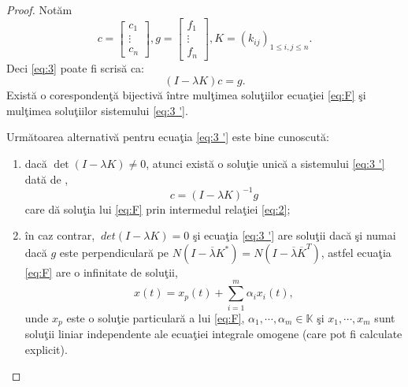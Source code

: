 \documentclass[a4paper,12pt,oneside]{report}
\begin{document}
\begin{proof}
Not\u{a}m
\begin{displaymath}
  c = \begin{bmatrix}
  c_{1}\\
  \vdots \\
  c_{n}
  \end{bmatrix},
  g = \begin{bmatrix}
  f_{1}\\
  \vdots \\
  f_{n}
  \end{bmatrix},
  K = \left ( k_{ij} \right )_{1\leq i,j\leq n}.
\end{displaymath}
Deci \ref{eq:3} poate fi scris\u{a} ca:
\begin{displaymath}
  \left ( I - \lambda K \right )c = g. \label{eq:3 '} \tag{3 '}
\end{displaymath}
Exist\u{a} o coresponden\c{t}\u{a} bijectiv\u{a} \^{i}ntre mul\c{t}imea solu\c{t}iilor ecua\c{t}iei \ref{eq:F} \c{s}i mul\c{t}imea solu\c{t}iilor sistemului \ref{eq:3 '}.

\noindent Urm\u{a}toarea alternativ\u{a} pentru ecua\c{t}ia \ref{eq:3 '} este bine cunoscut\u{a}:
\begin{enumerate}
    \item  dac\u{a} \(\det \left ( I - \lambda K  \right ) \neq 0\), atunci exist\u{a} o solu\c{t}ie unic\u{a} a sistemului \ref{eq:3 '} dat\u{a} de ,
\begin{displaymath}
  c = \left ( I - \lambda K \right )^{-1}g
\end{displaymath}
care d\u{a} solu\c{t}ia lui \ref{eq:F} prin intermedul rela\c{t}iei \ref{eq:2};
\item  \^{i}n caz contrar, \(\ det \left ( I - \lambda K  \right ) = 0\) \c{s}i ecua\c{t}ia \ref{eq:3 '} are solu\c{t}ii dac\u{a} \c{s}i numai dac\u{a} \(g\) este perpendicular\u{a} pe \(N\left ( I - \overline{\lambda} K^{\ast } \right ) = N\left ( I - \overline{\lambda} \overline{K}^{T} \right )\), astfel ecua\c{t}ia \ref{eq:F} are o infinitate de solu\c{t}ii,
\begin{displaymath}
  x \left ( t \right ) = x_{p}\left ( t \right ) + \sum_{i = 1}^{m}\alpha _{i}x_{i}\left ( t \right ),
\end{displaymath}
unde \( x_{p}\) este o solu\c{t}ie particular\u{a} a lui \ref{eq:F}, \(\alpha _{1},\cdots,\alpha _{m} \in \mathbb{K}\) \c{s}i \(x _{1},\cdots,x _{m}\) sunt solu\c{t}ii liniar independente ale ecua\c{t}iei integrale omogene (care pot fi calculate explicit).
\end{enumerate}

\end{proof}
  	      			      			      			      	
\end{document}
